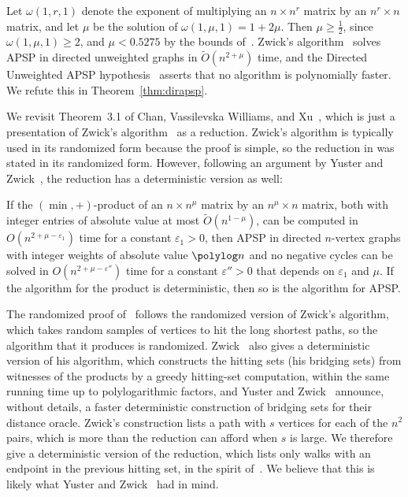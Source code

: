 Let $\omega(1,r,1)$ denote the exponent of multiplying an $n\times n^{r}$ matrix by an $n^{r}\times n$ matrix, and let $\mu$ be the solution of $\omega(1,\mu,1)=1+2\mu$. Then $\mu\ge\frac12$, since $\omega(1,\mu,1)\ge2$, and $\mu<0.5275$ by the bounds of~\cite{ADVXXZ25}. Zwick's algorithm~\cite{Zwi02} solves APSP in directed unweighted graphs in $\tilde O(n^{2+\mu})$ time, and the Directed Unweighted APSP hypothesis~\cite{CVX21,CVX23,Fis26} asserts that no algorithm is polynomially faster. We refute this in Theorem~\ref{thm:dirapsp}.

We revisit Theorem~3.1 of Chan, Vassilevska Williams, and Xu~\cite{CVX21}, which is just a presentation of Zwick's algorithm~\cite{Zwi02} as a reduction. Zwick's algorithm is typically used in its randomized form because the proof is simple, so the reduction in \cite{CVX21} was stated in its randomized form. However, following an argument by Yuster and Zwick~\cite[Section~8]{YZ05b}, the reduction has a deterministic version as well:

\begin{theorem}\label{thm:detred}
If the $(\min,+)$-product of an $n\times n^{\mu}$ matrix by an $n^{\mu}\times n$ matrix, both with integer entries of absolute value at most $\tilde{O}(n^{1-\mu})$, can be computed in $O(n^{2+\mu-\varepsilon_1})$ time for a constant $\varepsilon_1>0$, then APSP in directed $n$-vertex graphs with integer weights of absolute value $\polylog n$ and no negative cycles can be solved in $O(n^{2+\mu-\varepsilon''})$ time for a constant $\varepsilon''>0$ that depends on $\varepsilon_1$ and $\mu$. If the algorithm for the product is deterministic, then so is the algorithm for APSP.
\end{theorem}


The randomized proof of~\cite{CVX21} follows the randomized version of Zwick's algorithm, which takes random samples of vertices to hit the long shortest paths, so the algorithm that it produces is randomized. {Zwick~\cite[Sections~6 and~7]{Zwi02} also gives a deterministic version of his algorithm, which constructs the hitting sets (his bridging sets) from witnesses of the products by a greedy hitting-set computation, within the same running time up to polylogarithmic factors, and Yuster and Zwick~\cite[Section~8]{YZ05b} announce, without details, a faster deterministic construction of bridging sets for their distance oracle. Zwick's construction lists a path with $s$ vertices for each of the $n^2$ pairs, which is more than the reduction can afford when $s$ is large. We therefore give a deterministic version of the reduction, which lists only walks with an endpoint in the previous hitting set, in the spirit of~\cite{YZ05b}. We believe that this is likely what Yuster and Zwick~\cite{YZ05b} had in mind.} 



